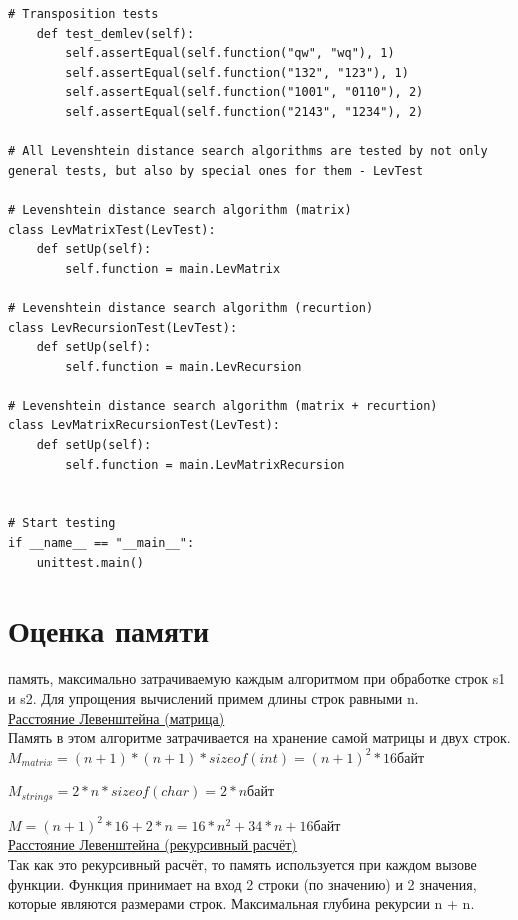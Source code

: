 \documentclass[12pt]{report}
\begin{document}
\begin{lstlisting}[label=some-code, caption = Тесты]
	# Transposition tests
	def test_demlev(self):
		self.assertEqual(self.function("qw", "wq"), 1)
		self.assertEqual(self.function("132", "123"), 1)
		self.assertEqual(self.function("1001", "0110"), 2)
		self.assertEqual(self.function("2143", "1234"), 2)
	
# All Levenshtein distance search algorithms are tested by not only general tests, but also by special ones for them - LevTest
	
# Levenshtein distance search algorithm (matrix)
class LevMatrixTest(LevTest):
	def setUp(self):
		self.function = main.LevMatrix
	
# Levenshtein distance search algorithm (recurtion)
class LevRecursionTest(LevTest):
	def setUp(self):
		self.function = main.LevRecursion

# Levenshtein distance search algorithm (matrix + recurtion)
class LevMatrixRecursionTest(LevTest):
	def setUp(self):
		self.function = main.LevMatrixRecursion
	
	
# Start testing
if __name__ == "__main__":
	unittest.main()
\end{lstlisting}

\section{Оценка памяти}
 память, максимально затрачиваемую каждым алгоритмом при обработке строк s1 и s2. Для упрощения вычислений примем длины строк равными n.\\

\underline{Расстояние Левенштейна (матрица)}\\

Память в этом алгоритме затрачивается на хранение самой матрицы и двух строк.\\

$M_{matrix} = (n + 1)*(n + 1)*sizeof(int) = (n + 1)^2 * 16 байт$

$M_{strings} = 2*n*sizeof(char) = 2*n байт$

$M = (n + 1)^2 * 16 + 2*n = 16 * n^2 + 34 * n + 16 байт$\\

\underline{Расстояние Левенштейна (рекурсивный расчёт)}\\

Так как это рекурсивный расчёт, то память используется при каждом вызове функции. Функция принимает на вход 2 строки (по значению) и 2 значения, которые являются размерами строк. Максимальная глубина рекурсии n + n. \\
\end{document}
